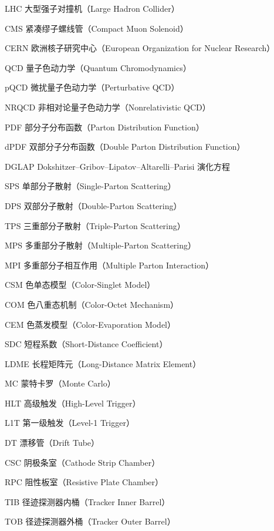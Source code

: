 
\begin{denotation}[3cm]
  \item[LHC] 大型强子对撞机（Large Hadron Collider）
  \item[CMS] 紧凑缪子螺线管（Compact Muon Solenoid）
  \item[CERN] 欧洲核子研究中心（European Organization for Nuclear Research）
  \item[QCD] 量子色动力学（Quantum Chromodynamics）
  \item[pQCD] 微扰量子色动力学（Perturbative QCD）
  \item[NRQCD] 非相对论量子色动力学（Nonrelativistic QCD）
  \item[PDF] 部分子分布函数（Parton Distribution Function）
  \item[dPDF] 双部分子分布函数（Double Parton Distribution Function）
  \item[DGLAP] Dokshitzer--Gribov--Lipatov--Altarelli--Parisi 演化方程
  \item[SPS] 单部分子散射（Single-Parton Scattering）
  \item[DPS] 双部分子散射（Double-Parton Scattering）
  \item[TPS] 三重部分子散射（Triple-Parton Scattering）
  \item[MPS] 多重部分子散射（Multiple-Parton Scattering）
  \item[MPI] 多重部分子相互作用（Multiple Parton Interaction）
  \item[CSM] 色单态模型（Color-Singlet Model）
  \item[COM] 色八重态机制（Color-Octet Mechanism）
  \item[CEM] 色蒸发模型（Color-Evaporation Model）
  \item[SDC] 短程系数（Short-Distance Coefficient）
  \item[LDME] 长程矩阵元（Long-Distance Matrix Element）
  \item[MC] 蒙特卡罗（Monte Carlo）
  \item[HLT] 高级触发（High-Level Trigger）
  \item[L1T] 第一级触发（Level-1 Trigger）
  \item[DT] 漂移管（Drift Tube）
  \item[CSC] 阴极条室（Cathode Strip Chamber）
  \item[RPC] 阻性板室（Resistive Plate Chamber）
  \item[TIB] 径迹探测器内桶（Tracker Inner Barrel）
  \item[TOB] 径迹探测器外桶（Tracker Outer Barrel）

\end{denotation}
